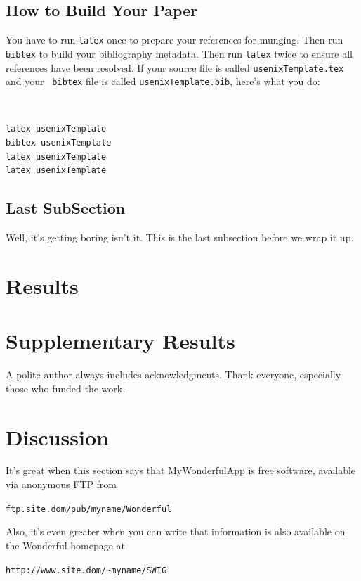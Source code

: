 \documentclass[letterpaper,twocolumn,10pt]{article}
\begin{document}
\subsection{How to Build Your Paper}

You have to run {\tt latex} once to prepare your references for
munging.  Then run {\tt bibtex} to build your bibliography metadata.
Then run {\tt latex} twice to ensure all references have been resolved.
If your source file is called {\tt usenixTemplate.tex} and your {\tt
  bibtex} file is called {\tt usenixTemplate.bib}, here's what you do:
{\tt \small
\begin{verbatim}
latex usenixTemplate
bibtex usenixTemplate
latex usenixTemplate
latex usenixTemplate
\end{verbatim}
}


\subsection{Last SubSection}

Well, it's getting boring isn't it.  This is the last subsection
before we wrap it up.


\section{Results}

\section{Supplementary Results}

A polite author always includes acknowledgments.  Thank everyone,
especially those who funded the work. 

\section{Discussion}

It's great when this section says that MyWonderfulApp is free software, 
available via anonymous FTP from

\begin{center}
{\tt ftp.site.dom/pub/myname/Wonderful}\\
\end{center}

Also, it's even greater when you can write that information is also 
available on the Wonderful homepage at 

\begin{center}
{\tt http://www.site.dom/\~{}myname/SWIG}
\end{center}
\end{document}

